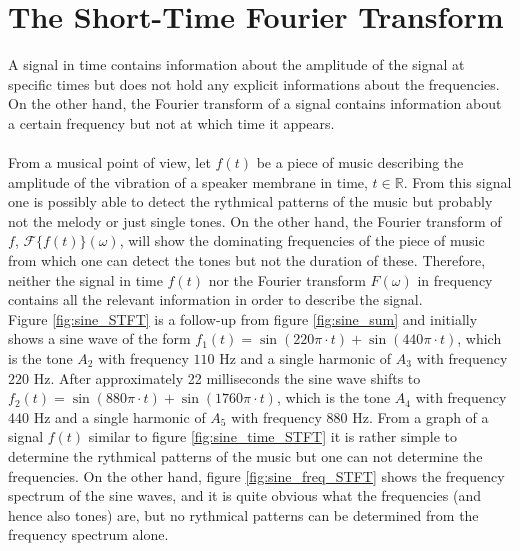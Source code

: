 \section{The Short-Time Fourier Transform}
A signal in time contains information about the amplitude of the signal at specific times but does not hold any explicit informations about the frequencies. On the other hand, the Fourier transform of a signal contains information about a certain frequency but not at which time it appears.
\\ \\
From a musical point of view, let $f(t)$ be a piece of music describing the amplitude of the vibration of a speaker membrane in time, $t \in \mathbb{R}$. From this signal one is possibly able to detect the rythmical patterns of the music but probably not the melody or just single tones. On the other hand, the Fourier transform of $f$, $\mathcal{F}\{f(t)\}(\omega)$, will show the dominating frequencies of the piece of music from which one can detect the tones but not the duration of these. Therefore, neither the signal in time $f(t)$ nor the Fourier transform $F(\omega)$ in frequency contains all the relevant information in order to describe the signal.
\\
Figure \ref{fig:sine_STFT} is a follow-up from figure \ref{fig:sine_sum} and initially shows a sine wave of the form $f_1(t) = \sin(220\pi\cdot t) + \sin(440\pi\cdot t)$, which is the tone $A_2$ with frequency $110$ Hz and a single harmonic of $A_3$ with frequency $220$ Hz. After approximately 22 milliseconds the sine wave shifts to $f_2(t) = \sin(880\pi\cdot t) + \sin(1760\pi\cdot t)$, which is the tone $A_4$ with frequency $440$ Hz and a single harmonic of $A_5$ with frequency $880$ Hz. From a graph of a signal $f(t)$ similar to figure \ref{fig:sine_time_STFT} it is rather simple to determine the rythmical patterns of the music but one can not determine the frequencies. On the other hand, figure \ref{fig:sine_freq_STFT} shows the frequency spectrum of the sine waves, and it is quite obvious what the frequencies (and hence also tones) are, but no rythmical patterns can be determined from the frequency spectrum alone.

